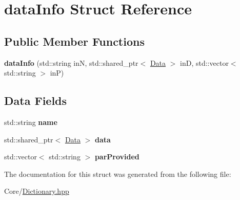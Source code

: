 \hypertarget{structdata_info}{\section{data\-Info Struct Reference}
\label{structdata_info}
}
\subsection*{Public Member Functions}
\begin{DoxyCompactItemize}
\item 
\hypertarget{structdata_info_afbd0f12fa5f00bcf6afe8943427e9d20}{{\bfseries data\-Info} (std\-::string in\-N, std\-::shared\-\_\-ptr$<$ \hyperlink{class_data}{Data} $>$ in\-D, std\-::vector$<$ std\-::string $>$ in\-P)}\label{structdata_info_afbd0f12fa5f00bcf6afe8943427e9d20}

\end{DoxyCompactItemize}
\subsection*{Data Fields}
\begin{DoxyCompactItemize}
\item 
\hypertarget{structdata_info_a4cc493db2d92cf7d7fe2337ddf436011}{std\-::string {\bfseries name}}\label{structdata_info_a4cc493db2d92cf7d7fe2337ddf436011}

\item 
\hypertarget{structdata_info_a89a54e128ff18553daa4c5ca7ce39483}{std\-::shared\-\_\-ptr$<$ \hyperlink{class_data}{Data} $>$ {\bfseries data}}\label{structdata_info_a89a54e128ff18553daa4c5ca7ce39483}

\item 
\hypertarget{structdata_info_adb09af7379e4ace99287a79e74d19fc3}{std\-::vector$<$ std\-::string $>$ {\bfseries par\-Provided}}\label{structdata_info_adb09af7379e4ace99287a79e74d19fc3}

\end{DoxyCompactItemize}


The documentation for this struct was generated from the following file\-:\begin{DoxyCompactItemize}
\item 
Core/\hyperlink{_dictionary_8hpp}{Dictionary.\-hpp}\end{DoxyCompactItemize}
